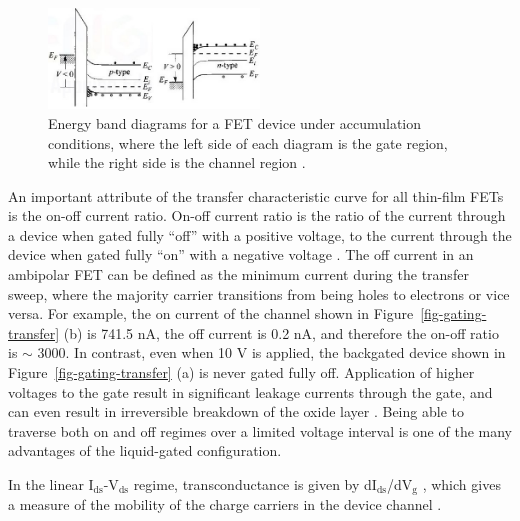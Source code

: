 \documentclass[
  a4paper,
]{scrbook}
\begin{document}
\begin{figure}

{\centering \includegraphics[width=0.5\textwidth,height=\textheight]{figures/ch2/accumulation.png}

}

\caption{\label{fig-accumulation}Energy band diagrams for a FET device
under accumulation conditions, where the left side of each diagram is
the gate region, while the right side is the channel region
\autocite{Sze2006}.}

\end{figure}

An important attribute of the transfer characteristic curve for all
thin-film FETs is the on-off current ratio. On-off current ratio is the
ratio of the current through a device when gated fully ``off'' with a
positive voltage, to the current through the device when gated fully
``on'' with a negative voltage \autocite{Zheng2017}. The off current in
an ambipolar FET can be defined as the minimum current during the
transfer sweep, where the majority carrier transitions from being holes
to electrons or vice versa. For example, the on current of the channel
shown in Figure~\ref{fig-gating-transfer} (b) is 741.5 nA, the off
current is 0.2 nA, and therefore the on-off ratio is \(\sim\) 3000. In
contrast, even when 10 V is applied, the backgated device shown in
Figure~\ref{fig-gating-transfer} (a) is never gated fully off.
Application of higher voltages to the gate result in significant leakage
currents through the gate, and can even result in irreversible breakdown
of the oxide layer \autocite{Sze2006}. Being able to traverse both on
and off regimes over a limited voltage interval is one of the many
advantages of the liquid-gated configuration.

In the linear I\(_\textrm{ds}\)-V\(_\textrm{ds}\) regime,
transconductance is given by dI\(_\textrm{ds}\)/dV\(_\textrm{g}\) ,
which gives a measure of the mobility of the charge carriers in the
device channel \autocite{Martel1998,Sze2006,Zheng2017}.
\end{document}
